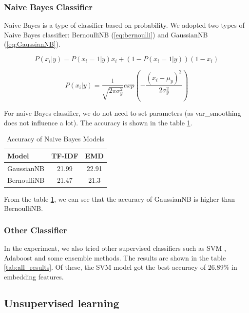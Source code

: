 \documentclass[11pt]{article}
\begin{document}
\subsubsection{Naive Bayes Classifier}

Naive Bayes \cite{nb_10.1007/BFb0029444} is a type of classifier based on probability.
We adopted two types of Naive Bayes classifier: BernoulliNB (\ref{eq:bernoulli}) and GaussianNB (\ref{eq:GaussianNB}).

\begin{equation}
    P(x_i|y) = P(x_i = 1 | y)x_i + (1 - P(x_i = 1 | y))(1 - x_i)
    \label{eq:bernoulli}
\end{equation}

\begin{equation}
    P(x_i|y) = \frac{1}{\sqrt{2\pi\sigma^2_y}} exp (-\frac{(x_i - \mu_y)^2}{2\sigma^2_y})
    \label{eq:GaussianNB}
\end{equation}



For naive Bayes classifier, we do not need to set parameters (as var\_smoothing does not influence a lot).
The accuracy is shown in the table \ref{tab:nb_results}.

\begin{table}[h!]
    \centering
    \caption{Accuracy of Naive Bayes Models}
    \label{tab:nb_results}
    \begin{tabular}{lcc}
    \toprule
    \textbf{Model} & \textbf{TF-IDF} & \textbf{EMD} \\
    \midrule
    GaussianNB     & 21.99 & 22.91 \\
    BernoulliNB    & 21.47 & 21.3 \\
    \bottomrule
    \end{tabular}
\end{table}

From the table \ref{tab:nb_results}, we can see that the accuracy of GaussianNB is higher than BernoulliNB.

\subsubsection{Other Classifier}

In the experiment, we also tried other supervised classifiers such as SVM \cite{svm_rejani2009early}, Adaboost and some ensemble methods.
The results are shown in the table \ref{tab:all_results}.
Of these, the SVM model got the best accuracy of 26.89\% in embedding features.

\subsection{Unsupervised learning}
\end{document}
